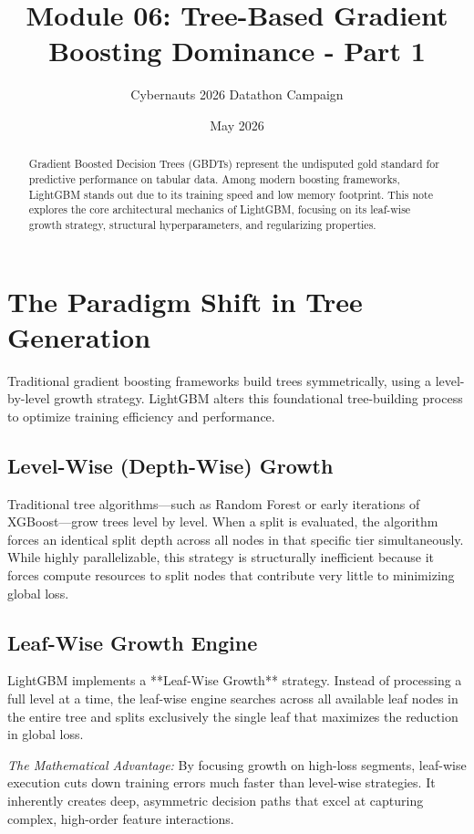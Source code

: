 \documentclass{article}
\title{Module 06: Tree-Based Gradient Boosting Dominance - Part 1}
\author{Cybernauts 2026 Datathon Campaign}
\date{May 2026}
\begin{document}
\maketitle

\begin{abstract}
Gradient Boosted Decision Trees (GBDTs) represent the undisputed gold standard for predictive performance on tabular data. Among modern boosting frameworks, LightGBM stands out due to its training speed and low memory footprint. This note explores the core architectural mechanics of LightGBM, focusing on its leaf-wise growth strategy, structural hyperparameters, and regularizing properties.
\end{abstract}

\tableofcontents
\newpage

\section{The Paradigm Shift in Tree Generation}
Traditional gradient boosting frameworks build trees symmetrically, using a level-by-level growth strategy. LightGBM alters this foundational tree-building process to optimize training efficiency and performance.

\subsection{Level-Wise (Depth-Wise) Growth}
Traditional tree algorithms—such as Random Forest or early iterations of XGBoost—grow trees level by level. When a split is evaluated, the algorithm forces an identical split depth across all nodes in that specific tier simultaneously. While highly parallelizable, this strategy is structurally inefficient because it forces compute resources to split nodes that contribute very little to minimizing global loss.

\subsection{Leaf-Wise Growth Engine}
LightGBM implements a **Leaf-Wise Growth** strategy. Instead of processing a full level at a time, the leaf-wise engine searches across all available leaf nodes in the entire tree and splits exclusively the single leaf that maximizes the reduction in global loss.

\textit{The Mathematical Advantage:} By focusing growth on high-loss segments, leaf-wise execution cuts down training errors much faster than level-wise strategies. It inherently creates deep, asymmetric decision paths that excel at capturing complex, high-order feature interactions.
\end{document}
